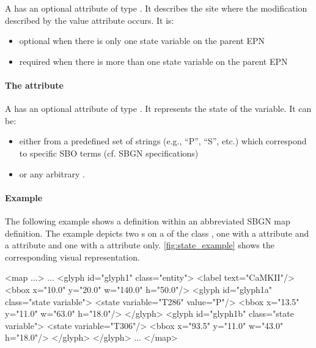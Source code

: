 A \State has an optional attribute  of type
.
It describes the site where the modification described by the value attribute occurs. It is:

\begin{itemize}
	\item optional when there is only one state variable on the parent EPN
  \item required when there is more than one state variable on the parent EPN
\end{itemize}

\paragraph{The \fixttspace{} attribute}

A \State has an optional attribute  of type
. It represents the state of the variable. It can be:

\begin{itemize}
	\item either from a predefined set of strings (e.g., ``P'', ``S'', etc.) which correspond to specific SBO terms (cf. SBGN specifications)
\item or any arbitrary .

\end{itemize}

\paragraph{Example}

The following example shows a \State definition within an abbreviated SBGN map definition. The example depicts two \State{}s on a \Glyph of the class , one \State with a  attribute and a  attribute and one \State with a  attribute only.
\vref{fig:state_example} shows the corresponding visual representation.

\begin{example}
<map ...>
    ...
    <glyph id="glyph1" class="entity">
        <label text="CaMKII"/>
        <bbox x="10.0" y="20.0" w="140.0" h="50.0"/>
        <glyph id="glyph1a" class="state variable">
            <state variable="T286" value="P"/>
            <bbox x="13.5" y="11.0" w="63.0" h="18.0"/>
        </glyph>
        <glyph id="glyph1b" class="state variable">
            <state variable="T306"/>
            <bbox x="93.5" y="11.0" w="43.0" h="18.0"/>
        </glyph>
    </glyph>
    ...
</map>
\end{example}

